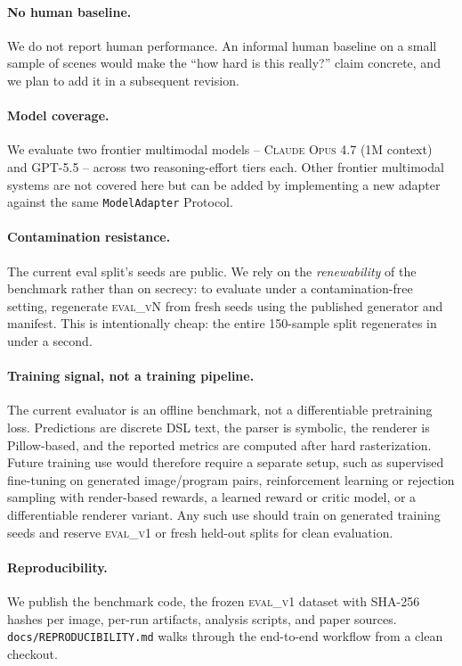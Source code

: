 \paragraph{No human baseline.}
We do not report human performance. An informal human baseline on a small
sample of scenes would make the ``how hard is this really?'' claim concrete,
and we plan to add it in a subsequent revision.

\paragraph{Model coverage.}
We evaluate two frontier multimodal models -- \textsc{Claude Opus 4.7} (1M
context) and \textsc{GPT-5.5} -- across two reasoning-effort tiers each. Other
frontier multimodal systems are not covered here but can be added by
implementing a new adapter against the same \texttt{ModelAdapter} Protocol.

\paragraph{Contamination resistance.}
The current eval split's seeds are public. We rely on the \emph{renewability}
of the benchmark rather than on secrecy: to evaluate under a contamination-free
setting, regenerate \textsc{eval\_vN} from fresh seeds using the published
generator and manifest. This is intentionally cheap: the entire 150-sample split
regenerates in under a second.

\paragraph{Training signal, not a training pipeline.}
The current evaluator is an offline benchmark, not a differentiable pretraining
loss. Predictions are discrete DSL text, the parser is symbolic, the renderer is
Pillow-based, and the reported metrics are computed after hard rasterization.
Future training use would therefore require a separate setup, such as supervised
fine-tuning on generated image/program pairs, reinforcement learning or
rejection sampling with render-based rewards, a learned reward or critic model,
or a differentiable renderer variant. Any such use should train on generated
training seeds and reserve \textsc{eval\_v1} or fresh held-out splits for clean
evaluation.

\paragraph{Reproducibility.}
We publish the benchmark code, the frozen \textsc{eval\_v1} dataset with
SHA-256 hashes per image, per-run artifacts, analysis scripts, and paper sources.
\texttt{docs/REPRODUCIBILITY.md} walks through the end-to-end workflow from a
clean checkout.


